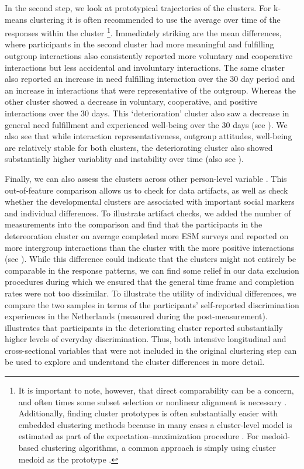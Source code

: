 In the second step, we look at prototypical trajectories of the
clusters. For k-means clustering it is often recommended to use the
average over time of the responses within the cluster
\citep[see ][]{niennattrakul2007}\footnote{It is important to note, however, that direct comparability can be a concern, and often times some subset selection or nonlinear alignment is necessary \citep[e.g.,][]{gupta1996}. Additionally, finding cluster prototypes is often substantially easier with embedded clustering methods because in many cases a cluster-level model is estimated as part of the expectation–maximization procedure \citep[e.g.,][]{denteuling2021}. For medoid-based clustering algorithms, a common approach is simply using cluster medoid as the prototype \citep{kaufman1990}.}.
Immediately striking are the mean differences, where participants in the
second cluster had more meaningful and fulfilling outgroup interactions
also consistently reported more voluntary and cooperative interactions
but less accidental and involuntary interactions. The same cluster also
reported an increase in need fulfilling interaction over the 30 day
period and an increase in interactions that were representative of the
outgroup. Whereas the other cluster showed a decrease in voluntary,
cooperative, and positive interactions over the 30 days. This
`deterioration' cluster also saw a decrease in general need fulfillment
and experienced well-being over the 30 days (see
). We also see that while interaction
representativeness, outgroup attitudes, well-being are relatively stable
for both clusters, the deteriorating cluster also showed substantially
higher variablity and instability over time (also see
).

Finally, we can also assess the clusters across other person-level
variable \citep[e.g.,][]{monden2022}. This out-of-feature comparison
allows us to check for data artifacts, as well as check whether the
developmental clusters are associated with important social markers and
individual differences. To illustrate artifact checks, we added the
number of measurements into the comparison and find that the
participants in the detereoration cluster on average completed more ESM
surveys and reported on more intergroup interactions than the cluster
with the more positive interactions (see ).
While this difference could indicate that the clusters might not
entirely be comparable in the response patterns, we can find some relief
in our data exclusion procedures during which we ensured that the
general time frame and completion rates were not too dissimilar. To
illustrate the utility of individual differences, we compare the two
samples in terms of the participants' self-reported discrimination
experiences in the Netherlands (measured during the post-measurement).
 illustrates that participants in the
deteriorating cluster reported substantially higher levels of everyday
discrimination. Thus, both intensive longitudinal and cross-sectional
variables that were not included in the original clustering step can be
used to explore and understand the cluster differences in more detail.

